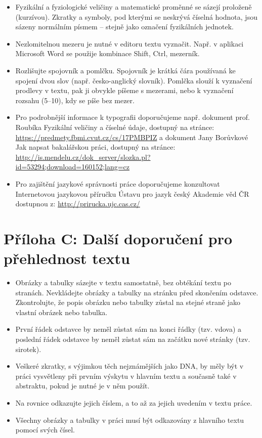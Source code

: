     \begin{itemize}
        \item Fyzikální a fyziologické veličiny a matematické proměnné se sázejí proloženě (kurzívou). Zkratky a symboly, pod kterými se neskrývá číselná hodnota, jsou sázeny normálním písmem – stejně jako označení fyzikálních jednotek.
        \item Nezlomitelnou mezeru je nutné v editoru textu vyznačit. Např. v aplikaci Microsoft Word se použije kombinace Shift, Ctrl, mezerník. 
        \item Rozlišujte spojovník a pomlčku. Spojovník je krátká čára používaná ke spojení dvou slov (např. česko-anglický slovník). Pomlčka slouží k vyznačení prodlevy v textu, pak ji obvykle píšeme s mezerami, nebo k vyznačení rozsahu (5–10), kdy se píše bez mezer.
        \item Pro podrobnější informace k typografii doporučujeme např. dokument prof. Roubíka Fyzikální veličiny a číselné údaje, dostupný na stránce:
\url{https://predmety.fbmi.cvut.cz/cs/17PMBPIZ}
a dokument Jany Borůvkové Jak napsat bakalářskou práci, dostupný na stránce:
\url{http://is.mendelu.cz/dok_server/slozka.pl?id=53294;download=160152;lang=cz}
        \item Pro zajištění jazykové správnosti práce doporučujeme konzultovat Internetovou jazykovou příručku Ústavu pro jazyk český Akademie věd ČR dostupnou z: 
\url{http://prirucka.ujc.cas.cz/}
    \end{itemize}
    
\clearpage

\section*{Příloha C: Další doporučení pro přehlednost textu}
    \label{app:doporuceni}
    
    \begin{itemize}
        \item Obrázky a tabulky sázejte v textu samostatně, bez obtékání textu po stranách. Nevkládejte obrázky a tabulky na stránku před skončením odstavce. Zkontrolujte, že popis obrázku nebo tabulky zůstal na stejné straně jako vlastní obrázek nebo tabulka.
        \item První řádek odstavce by neměl zůstat sám na konci řádky (tzv. vdova) a poslední řádek odstavce by neměl zůstat sám na začátku nové stránky (tzv. sirotek).
        \item Veškeré zkratky, s výjimkou těch nejznámějších jako DNA, by měly být v práci vysvětleny při prvním výskytu v hlavním textu a současně také v abstraktu, pokud je nutné je v něm použít.
        \item Na rovnice odkazujte jejich číslem, a to až za jejich uvedením v textu práce.
        \item Všechny obrázky a tabulky v práci musí být odkazovány z hlavního textu pomocí svých čísel. 
    \end{itemize}

